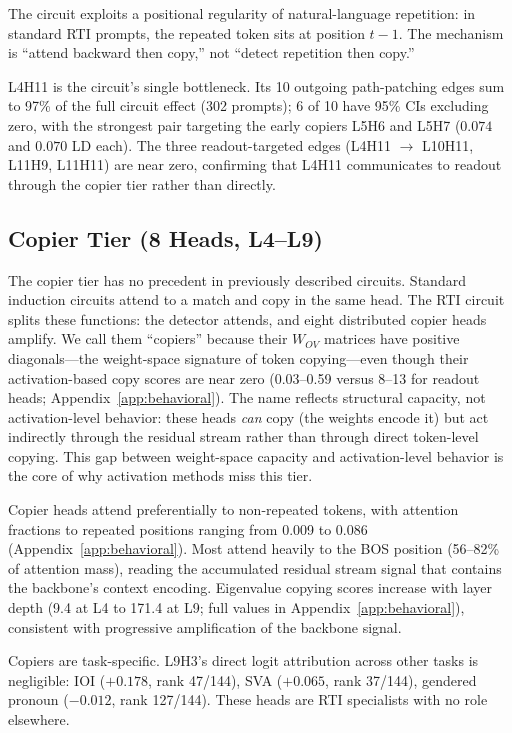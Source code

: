 \documentclass{article}
\begin{document}
The circuit exploits a positional regularity of natural-language
repetition: in standard RTI prompts, the repeated token sits at
position $t{-}1$. The mechanism is ``attend backward then copy,''
not ``detect repetition then copy.''

L4H11 is the circuit's single bottleneck. Its 10 outgoing path-patching
edges sum to 97\% of the full circuit effect (302 prompts); 6 of 10
have 95\% CIs excluding zero, with the strongest pair targeting the
early copiers L5H6 and L5H7 ($0.074$ and $0.070$ LD each). The three
readout-targeted edges (L4H11 $\to$ L10H11, L11H9, L11H11) are near
zero, confirming that L4H11 communicates to readout through the copier
tier rather than directly.

\subsection{Copier Tier (8 Heads, L4--L9)}

The copier tier has no precedent in previously described circuits.
Standard induction circuits attend to a match and copy in the same head.
The RTI circuit splits these functions: the detector attends, and eight
distributed copier heads amplify. We call them ``copiers'' because their
$W_{OV}$ matrices have positive diagonals---the weight-space signature
of token copying---even though their activation-based copy scores are
near zero (0.03--0.59 versus 8--13 for readout heads;
Appendix~\ref{app:behavioral}). The name reflects structural capacity,
not activation-level behavior: these heads \emph{can} copy (the weights
encode it) but act indirectly through the residual stream rather than
through direct token-level copying. This gap between weight-space
capacity and activation-level behavior is the core of why activation
methods miss this tier.

Copier heads attend preferentially to non-repeated tokens, with
attention fractions to repeated positions ranging from 0.009 to 0.086
(Appendix~\ref{app:behavioral}). Most attend heavily to the BOS
position (56--82\% of attention mass), reading the accumulated residual
stream signal that contains the backbone's context encoding.
Eigenvalue copying scores increase with layer depth (9.4 at L4 to
171.4 at L9; full values in Appendix~\ref{app:behavioral}), consistent
with progressive amplification of the backbone signal.

Copiers are task-specific. L9H3's direct logit attribution across
other tasks is negligible: IOI ($+0.178$, rank 47/144), SVA
($+0.065$, rank 37/144), gendered pronoun ($-0.012$, rank 127/144).
These heads are RTI specialists with no role elsewhere.
\end{document}

